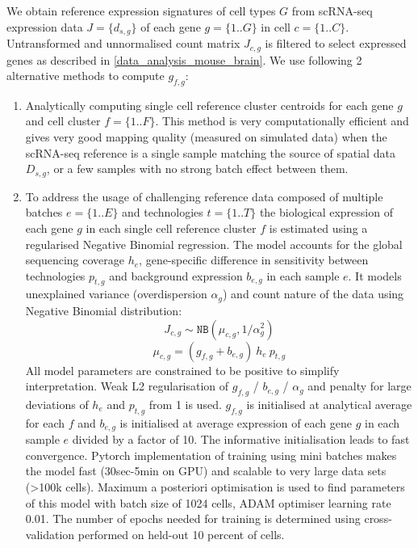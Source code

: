 \documentclass[11pt,a4paper]{article}
\begin{document}
We obtain reference expression signatures of cell types $G$ from scRNA-seq  expression data $J=\{d_{s,g}\}$ of each gene $g=\{1..G\}$ in cell $c=\{1..C\}$. Untransformed and unnormalised count matrix $J_{c,g}$ is filtered to select expressed genes as described in \ref{data_analysis_mouse_brain}. We use following 2 alternative methods to compute $g_{f,g}$:
\begin{enumerate}
    \item Analytically computing single cell reference cluster centroids for each gene $g$ and cell cluster $f=\{1..F\}$. This method is very computationally efficient and gives very good mapping quality (measured on simulated data) when the scRNA-seq reference is a single sample matching the source of spatial data $D_{s,g}$, or a few samples with no strong batch effect between them.
    \item To address the usage of challenging reference data composed of multiple batches $e=\{1..E\}$ and technologies $t=\{1..T\}$ the biological expression of each gene $g$ in each single cell reference cluster $f$ is estimated using a regularised Negative Binomial regression. The model accounts for the global sequencing coverage $h_e$, gene-specific difference in sensitivity between technologies $p_{t,g}$ and background expression $b_{e,g}$ in each sample $e$. It models unexplained variance (overdispersion $\alpha_g$) and count nature of the data using Negative Binomial distribution:
    \begin{equation} \label{eq:c2l_ref_prog:1}
    J_{c,g} \sim \mathtt{NB}(\mu_{c,g}, 1 / \alpha_g^2)
    \end{equation}
    \begin{equation} \label{eq:c2l_ref_prog:2}
    \mu_{c,g} = (g_{f,g} + b_{e,g}) \: {h_e} \: p_{t,g}
    \end{equation}
    All model parameters are constrained to be positive to simplify interpretation. Weak L2 regularisation of $g_{f,g}$ / $b_{e,g}$ / $\alpha_g$ and penalty for large deviations of $h_e$ and $p_{t,g}$ from 1 is used. $g_{f,g}$ is initialised at analytical average for each $f$ and $b_{e,g}$ is initialised at average expression of each gene $g$ in each sample $e$ divided by a factor of 10. The informative initialisation leads to fast convergence.  \newline
    Pytorch implementation of training using mini batches makes the model fast (30sec-5min on GPU) and scalable to very large data sets (>100k cells). Maximum a posteriori optimisation is used to find parameters of this model with batch size of 1024 cells, ADAM optimiser learning rate 0.01. The number of epochs needed for training is determined using cross-validation performed on held-out 10 percent of cells. \newline

\end{enumerate}
\end{document}
